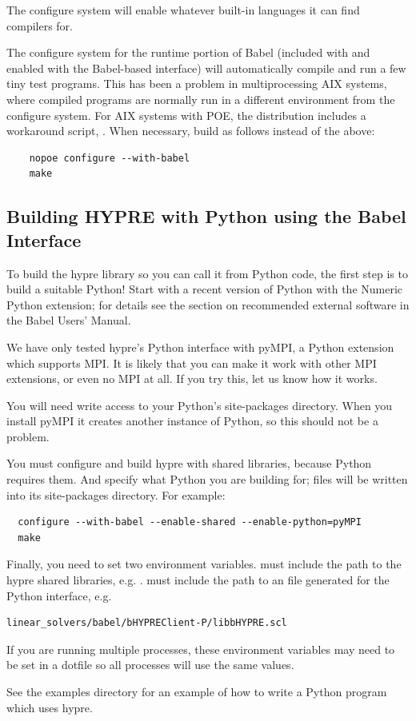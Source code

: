 The configure system will enable whatever built-in languages it can
find compilers for.

The configure system for the runtime portion of Babel (included with
\hypre{} and enabled with the Babel-based interface) will
automatically compile and run a few tiny test programs.  This has been
a problem in multiprocessing AIX systems, where compiled programs are
normally run in a different environment from the configure system.
For AIX systems with POE, the
\hypre{} distribution includes a workaround script, .
When necessary, build \hypre{} as follows instead of the above:

\begin{verbatim}
    nopoe configure --with-babel
    make
\end{verbatim}


\subsection{Building HYPRE with Python using the Babel Interface}
\label{sec-Building-Babel-Python}

To build the hypre library so you can call it from Python code, the
first step is to build a suitable Python!  Start with a recent version
of Python with the Numeric Python extension; for details see the
section on recommended external software in the Babel Users' Manual.

We have only tested hypre's Python interface with pyMPI, a Python
extension which supports MPI.  It is likely that you can make it work
with other MPI extensions, or even no MPI at all.  If you try this,
let us know how it works.

You will need write access to your Python's site-packages directory.
When you install pyMPI it creates another instance of Python, so this
should not be a problem.

You must configure and build hypre with shared libraries, because
Python requires them.  And specify what Python you are building for;
files will be written into its site-packages directory.
For example:
\begin{verbatim}
  configure --with-babel --enable-shared --enable-python=pyMPI
  make
\end{verbatim}

Finally, you need to set two environment variables.
 must include the path to the hypre shared
libraries, e.g. .
 must include the path to an
 file generated for the Python interface,
e.g.\begin{verbatim}
linear_solvers/babel/bHYPREClient-P/libbHYPRE.scl
\end{verbatim}
If you are running multiple processes, these environment variables may
need to be set in a dotfile so all processes will use the same values.

See the examples directory for an example of how to write a Python
program which uses hypre.
